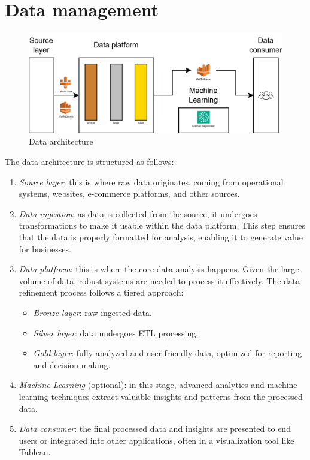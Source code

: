 \section{Data management}


\begin{figure}[H]
    \centering
    \includegraphics[width=0.75\linewidth]{images/bis11.png}
    \caption{Data architecture}
\end{figure}
The data architecture is structured as follows:
\begin{enumerate}
    \item \textit{Source layer}: this is where raw data originates, coming from operational systems, websites, e-commerce platforms, and other sources.
    \item \textit{Data ingestion}: as data is collected from the source, it undergoes transformations to make it usable within the data platform. 
        This step ensures that the data is properly formatted for analysis, enabling it to generate value for businesses.
    \item \textit{Data platform}: this is where the core data analysis happens. 
        Given the large volume of data, robust systems are needed to process it effectively. 
        The data refinement process follows a tiered approach:
        \begin{itemize}
            \item \textit{Bronze layer}: raw ingested data.
            \item \textit{Silver layer}: data undergoes ETL processing.
            \item \textit{Gold layer}: fully analyzed and user-friendly data, optimized for reporting and decision-making.
        \end{itemize}
    \item \textit{Machine Learning} (optional): in this stage, advanced analytics and machine learning techniques extract valuable insights and patterns from the processed data.
    \item \textit{Data consumer}: the final processed data and insights are presented to end users or integrated into other applications, often in a visualization tool like Tableau.
\end{enumerate}








